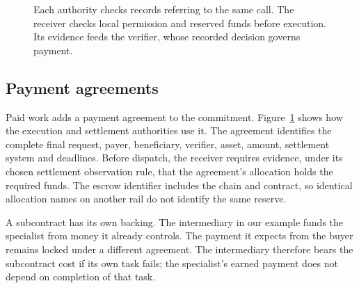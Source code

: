 \begin{figure}[ht]
\centering
{}
\caption{Each authority checks records referring to the same call. The receiver
checks local permission and reserved funds before execution. Its evidence feeds
the verifier, whose recorded decision governs payment.}
\label{fig:work}
\end{figure}

\subsection{Payment agreements}
Paid work adds a payment agreement to the commitment. Figure~\ref{fig:work}
shows how the execution and settlement authorities use it. The agreement
identifies the complete final request, payer, beneficiary,
verifier, asset, amount, settlement system and deadlines. Before dispatch, the
receiver requires evidence, under its chosen settlement observation rule, that
the agreement's allocation holds the required funds. The escrow identifier
includes the chain and contract, so identical allocation names on another rail
do not identify the same reserve.

A subcontract has its own backing. The intermediary in our example funds the
specialist from money it already controls. The payment it expects from the buyer
remains locked under a different agreement. The intermediary therefore bears
the subcontract cost if its own task fails; the specialist's earned payment does
not depend on completion of that task.

